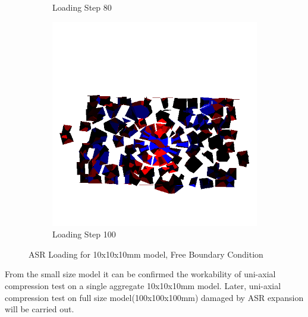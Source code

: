 \begin{figure}[ht!]
\begin{subfigure}{.33\textwidth}
      \caption{Loading Step 80}
      \end{subfigure}%
      \begin{subfigure}{.33\textwidth}
        \centering
        \includegraphics[width=1.0\linewidth]{Files/Small_ASR/Free_IS2/DEP5-STEP(120).png}
        \caption{Loading Step 100}
      \end{subfigure}

  \caption{ASR Loading for 10x10x10mm model, Free Boundary Condition}
  \label{fig:ASR_Loading_s_free}
\end{figure}

From the small size model it can be confirmed the workability of uni-axial compression test on a single aggregate 10x10x10mm model. Later, uni-axial compression test on full size model(100x100x100mm) damaged by ASR expansion will be carried out.
